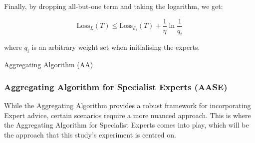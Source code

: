 Finally, by dropping all-but-one term and taking the logarithm, we get: 

\begin{equation}
    \text{Loss}_L(T) \leq \text{Loss}_{\mathcal{E}_i}(T) + \frac{1}{\eta}\ln\frac{1}{q_i}
\end{equation}

where $q_i$ is an arbitrary weight set when initialising the experts.

\begin{algorithm}[ht]
    \caption{Aggregating Algorithm (AA)}\label{algorithm:aggregationg_algorithm}
    \begin{algorithmic}[1]
    \end{algorithmic}
\end{algorithm}

\subsubsection{Aggregating Algorithm for Specialist Experts (AASE)}\label{subsubsection:aggregating_algorithm_for_specialist_experts}
While the Aggregating Algorithm provides a robust framework for incorporating Expert advice, certain scenarios require a more nuanced approach. This is where the Aggregating Algorithm for Specialist Experts comes into play, which will be the approach that this study's experiment is centred on.

